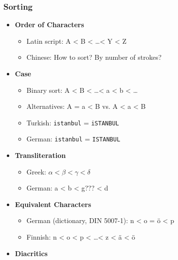 \documentclass[a4paper, 11pt, accentcolor = tud3b]{tudreport}
\providecommand{\ambiguity}[1]{\textcolor{ambiguityorange}{#1}}
\begin{document}
                \subsubsection{Sorting} %
                    \begin{itemize}
                    	\item \textbf{Order of Characters}
                    		\begin{itemize}
                    			\item Latin script: A < B < \dots < Y < Z
                    			\item Chinese: How to sort? By number of strokes?
                    		\end{itemize}
                    	\item \textbf{Case}
                    		\begin{itemize}
                    			\item Binary sort: A < B < \dots < a < b < \dots
                    			\item Alternatives: \ambiguity{A = a} < B vs. \ambiguity{A < a} < B
                    			\item Turkish: \texttt{istanbul} = \texttt{iSTANBUL}
                    			\item German: \texttt{istanbul} = \texttt{ISTANBUL}
                    		\end{itemize}
                    	\item \textbf{Transliteration}
                    		\begin{itemize}
                    			\item Greek: \( \alpha < \beta < \gamma < \delta \)
                    			\item German: a < b < \ambiguity{g???} < d
                    		\end{itemize}
                    	\item \textbf{Equivalent Characters}
                    		\begin{itemize}
                    			\item German (dictionary, DIN 5007-1): n < \ambiguity{o} = \ambiguity{ö} < p
                    			\item Finnish: n < \ambiguity{o} < p < \dots < z < ä < \ambiguity{ö}
                    		\end{itemize}
                    	\item \textbf{Diacritics}
                    		\begin{itemize}

\end{itemize}
\end{itemize}
\end{document}
